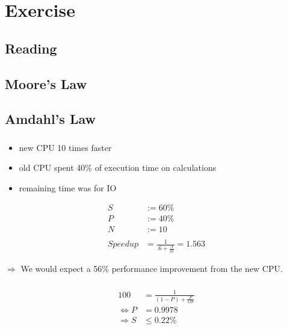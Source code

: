 \documentclass[]{scrartcl}
\newcommand{\exercise}{Exercise \thesection}
\begin{document}
\section*{\exercise}
\subsection{Reading}
\subsection{Moore's Law}
\subsubsection{}

\subsection{Amdahl's Law}
\subsubsection{}
\begin{itemize}
    \item new CPU 10 times faster
    \item old CPU spent 40\% of execution time on calculations
    \item remaining time was for IO
\end{itemize}
\begin{align}
    S &:= 60\%\\
    P &:= 40\%\\
    N &:= 10\\\nonumber\\
    Speedup &= \frac{1}{.6+\frac{.4}{10}} = 1.563
\end{align}

$\Rightarrow$ We would expect a 56\% performance improvement from the new CPU\@.

\subsubsection{}

\subsubsection{}
\begin{align}
    100 &= \frac{1}{(1-P)+\frac{P}{128}}\\
    \Leftrightarrow P&= 0.9978\\
    \Rightarrow S &\leq 0.22\%
\end{align}
\end{document}
